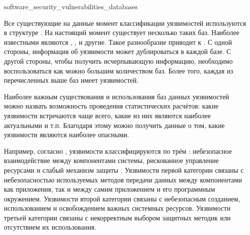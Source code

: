 
	{software_security_vulnerabilities_databases}

%
Все существующие на данные момент классификации уязвимостей используются в структуре .
%
На настоящий момент существует несколько таких баз. 
%
Наиболее известными являются  ,  ,   и другие. 
%
Такое разнообразие приводит к .
%
С одной стороны, информация об уязвимости может дублироваться в каждой базе.
%
С другой стороны, чтобы получить исчерпывающую информацию, необходимо воспользоваться как можно большим количеством баз.
%
Более того, каждая из перечисленных выше баз имеет  уязвимостей.

%
Наиболее важным  существования и использования баз данных уязвимостей можно назвать возможность проведения статистических расчётов: какие уязвимости встречаются чаще всего, какие из них являются наиболее актуальными и т.п.
%
Благодаря этому можно получить данные о том, какие уязвимости являются наиболее опасными. 

%
Например, согласно , уязвимости классифицируются по трём : небезопасное взаимодействие между компонентами системы, рискованное управление ресурсами и слабый механизм защиты .
%
Уязвимости первой категории связаны с небезопасностью используемых методов передачи данных между компонентами как приложения, так и между самим приложением и его программным окружением. 
%
Уязвимости второй категории связаны с небезопасным созданием, использованием и освобождением важных системных ресурсов. 
%
Уязвимости третьей категории связаны с некорректным выбором защитных методик или отсутствием их использования.